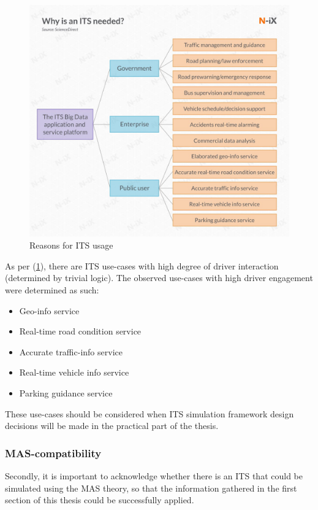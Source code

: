 \documentclass[main.tex]{subfiles}
\begin{document}
\begin{figure}[htbp]
    \centering
    \includegraphics[width=.8\textwidth]{why is ITS needed.jpg}
    \caption{Reasons for ITS usage}
    \label{whyITS}
\end{figure}

As per (\ref{whyITS}), there are ITS use-cases with high degree of driver interaction (determined 
by trivial logic). The observed use-cases with high driver engagement were determined as such:

\begin{itemize}
    \item Geo-info service
    \item Real-time road condition service 
    \item Accurate traffic-info service 
    \item Real-time vehicle info service 
    \item Parking guidance service
\end{itemize}

These use-cases should be considered when ITS simulation framework design decisions will be made in the practical part of the 
thesis.

\subsubsection{MAS-compatibility} \label{mas-compatibility}

Secondly, it is important to acknowledge whether there is an ITS that could be simulated using the MAS theory,
so that the information gathered in the first section of this thesis could be successfully applied.
\end{document}

